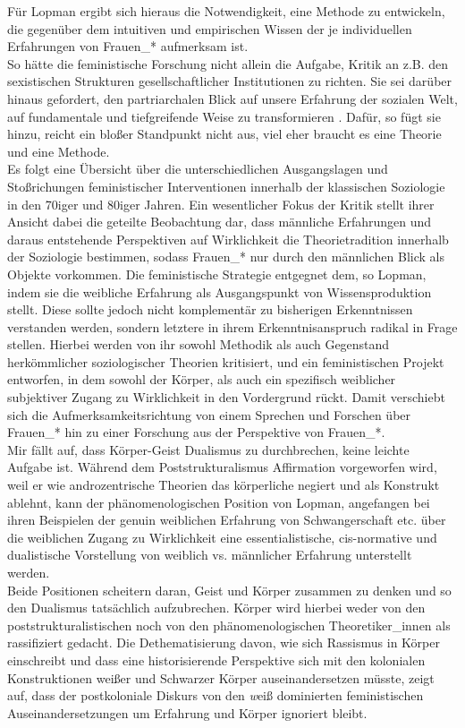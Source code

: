 Für Lopman ergibt sich hieraus die Notwendigkeit, eine Methode zu entwickeln,
die gegenüber dem \glqq intuitiven und empirischen Wissen \grqq \footnotemark
{} der je individuellen
Erfahrungen von Frauen\_* aufmerksam ist.\\
 So hätte die feministische Forschung
nicht allein die Aufgabe, Kritik an z.B. den sexistischen Strukturen
gesellschaftlicher Institutionen zu richten. Sie sei darüber hinaus gefordert,
\glqq den partriarchalen Blick auf unsere Erfahrung der sozialen Welt, auf
fundamentale und tiefgreifende Weise zu transformieren \grqq . Dafür, so fügt sie
hinzu, reicht ein bloßer Standpunkt nicht aus, viel eher braucht es eine
Theorie und eine Methode.\\
 Es folgt eine Übersicht über die unterschiedlichen
Ausgangslagen und Stoßrichungen feministischer Interventionen innerhalb der
klassischen Soziologie in den 70iger und 80iger Jahren. Ein wesentlicher Fokus
der Kritik stellt ihrer Ansicht dabei die geteilte Beobachtung dar, dass
männliche Erfahrungen und daraus entstehende Perspektiven auf Wirklichkeit die
Theorietradition innerhalb der Soziologie bestimmen, sodass Frauen\_* nur durch
den männlichen Blick als Objekte vorkommen. Die feministische Strategie
entgegnet dem, so Lopman, indem sie die weibliche Erfahrung als Ausgangspunkt
von Wissensproduktion stellt. Diese sollte jedoch nicht komplementär zu
bisherigen Erkenntnissen verstanden werden, sondern letztere in ihrem
Erkenntnisanspruch radikal in Frage stellen. Hierbei werden von ihr sowohl
Methodik als auch Gegenstand herkömmlicher soziologischer Theorien kritisiert,
und ein feministischen Projekt entworfen, in dem sowohl der Körper, als auch
ein spezifisch weiblicher subjektiver Zugang zu Wirklichkeit in den Vordergrund
rückt. Damit verschiebt sich die Aufmerksamkeitsrichtung von einem Sprechen und
Forschen über Frauen\_* hin zu einer Forschung aus der Perspektive von
Frauen\_*. \footnotemark {}\\

\noindent Mir fällt auf, dass Körper-Geist Dualismus zu durchbrechen, keine leichte
Aufgabe ist. Während dem Poststrukturalismus Affirmation vorgeworfen wird, weil
er wie androzentrische Theorien das körperliche negiert und als Konstrukt
ablehnt, kann der phänomenologischen Position von Lopman, angefangen bei ihren
Beispielen der genuin weiblichen Erfahrung von Schwangerschaft etc. über die
weiblichen Zugang zu Wirklichkeit eine essentialistische, cis-normative und
dualistische Vorstellung von weiblich vs. männlicher Erfahrung unterstellt
werden. \\
Beide Positionen scheitern daran, Geist und Körper zusammen zu denken
und so den Dualismus tatsächlich aufzubrechen. Körper wird hierbei weder von
den poststrukturalistischen noch von den phänomenologischen Theoretiker\_innen
als rassifiziert gedacht. Die Dethematisierung davon, wie sich Rassismus in
Körper einschreibt und dass eine historisierende Perspektive sich mit den
kolonialen Konstruktionen weißer und Schwarzer Körper auseinandersetzen müsste,
zeigt auf, dass der postkoloniale Diskurs von den \textit{w}eiß dominierten
feministischen Auseinandersetzungen um Erfahrung und Körper ignoriert bleibt.\\

